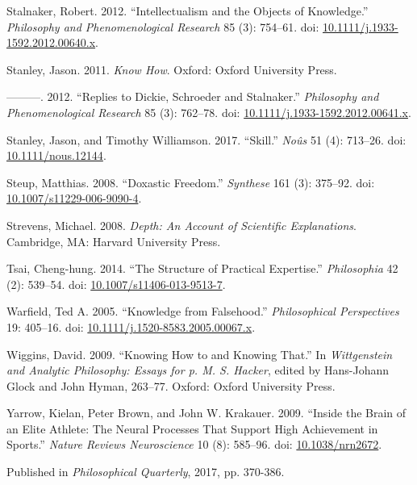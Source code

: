 \documentclass[
  10pt,
  letterpaper,
  DIV=11,
  numbers=noendperiod,
  twoside]{scrartcl}
\newlength{\cslhangindent}
\newenvironment{CSLReferences}[2] %
 {\begin{list}{}{%
  \setlength{\itemindent}{0pt}
  \setlength{\leftmargin}{0pt}
  \setlength{\parsep}{0pt}
  \ifodd #1
   \setlength{\leftmargin}{\cslhangindent}
   \setlength{\itemindent}{-1\cslhangindent}
  \fi
  \setlength{\itemsep}{#2\baselineskip}}}
 {\end{list}}
\begin{document}
\begin{CSLReferences}{1}{0}
Stalnaker, Robert. 2012. {``Intellectualism and the Objects of
Knowledge.''} \emph{Philosophy and Phenomenological Research} 85 (3):
754--61. doi:
\href{https://doi.org/10.1111/j.1933-1592.2012.00640.x}{10.1111/j.1933-1592.2012.00640.x}.

Stanley, Jason. 2011. \emph{Know How}. Oxford: Oxford University Press.

---------. 2012. {``Replies to Dickie, Schroeder and Stalnaker.''}
\emph{Philosophy and Phenomenological Research} 85 (3): 762--78. doi:
\href{https://doi.org/10.1111/j.1933-1592.2012.00641.x}{10.1111/j.1933-1592.2012.00641.x}.

Stanley, Jason, and Timothy Williamson. 2017. {``Skill.''} \emph{No{û}s}
51 (4): 713--26. doi:
\href{https://doi.org/10.1111/nous.12144}{10.1111/nous.12144}.

Steup, Matthias. 2008. {``Doxastic Freedom.''} \emph{Synthese} 161 (3):
375--92. doi:
\href{https://doi.org/10.1007/s11229-006-9090-4}{10.1007/s11229-006-9090-4}.

Strevens, Michael. 2008. \emph{Depth: An Account of Scientific
Explanations}. Cambridge, MA: Harvard University Press.

Tsai, Cheng-hung. 2014. {``The Structure of Practical Expertise.''}
\emph{Philosophia} 42 (2): 539--54. doi:
\href{https://doi.org/10.1007/s11406-013-9513-7}{10.1007/s11406-013-9513-7}.

Warfield, Ted A. 2005. {``Knowledge from Falsehood.''}
\emph{Philosophical Perspectives} 19: 405--16. doi:
\href{https://doi.org/10.1111/j.1520-8583.2005.00067.x}{10.1111/j.1520-8583.2005.00067.x}.

Wiggins, David. 2009. {``Knowing How to and Knowing That.''} In
\emph{Wittgenstein and Analytic Philosophy: Essays for p. M. S. Hacker},
edited by Hans-Johann Glock and John Hyman, 263--77. Oxford: Oxford
University Press.

Yarrow, Kielan, Peter Brown, and John W. Krakauer. 2009. {``Inside the
Brain of an Elite Athlete: The Neural Processes That Support High
Achievement in Sports.''} \emph{Nature Reviews Neuroscience} 10 (8):
585--96. doi: \href{https://doi.org/10.1038/nrn2672}{10.1038/nrn2672}.

\end{CSLReferences}



\noindent Published in\emph{
Philosophical Quarterly}, 2017, pp. 370-386.
\end{document}
